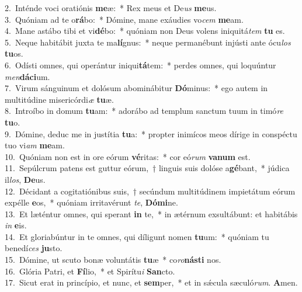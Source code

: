 {2.~}Inténde voci oratiónis \textbf{me}æ:~* Rex meus et De\textit{us} \textbf{me}us.\\
{3.~}Quóniam ad te o\textbf{rá}bo:~* Dómine, mane exáudies vo\textit{cem} \textbf{me}am.\\
{4.~}Mane astábo tibi et vi\textbf{dé}bo:~* quóniam non Deus volens iniquitá\textit{tem} \textbf{tu} es.\\
{5.~}Neque habitábit juxta te ma\textbf{lí}gnus:~* neque permanébunt injústi ante ócu\textit{los} \textbf{tu}os.\\
{6.~}Odísti omnes, qui operántur iniqui\textbf{tá}tem:~* perdes omnes, qui loquúntur \textit{men}\textbf{dá}\textbf{ci}um.\\
{7.~}Virum sánguinum et dolósum abominábitur \textbf{Dó}minus:~* ego autem in multitúdine misericórdi\textit{æ} \textbf{tu}æ.\\
{8.~}Introíbo in domum \textbf{tu}am:~* adorábo ad templum sanctum tuum in timó\textit{re} \textbf{tu}o.\\
{9.~}Dómine, deduc me in justítia \textbf{tu}a:~* propter inimícos meos dírige in conspéctu tuo vi\textit{am} \textbf{me}am.\\
{10.~}Quóniam non est in ore eórum \textbf{vé}ritas:~* cor eó\textit{rum} \textbf{va}\textbf{num} est.\\
{11.~}Sepúlcrum patens est guttur eórum,~† linguis suis dolóse a\textbf{gé}bant,~* júdica il\textit{los}, \textbf{De}us.\\
{12.~}Décidant a cogitatiónibus suis,~† secúndum multitúdinem impietátum eórum expélle \textbf{e}os,~* quóniam irritavérunt \textit{te}, \textbf{Dó}\textbf{mi}ne.\\
{13.~}Et læténtur omnes, qui sperant \textbf{in} te,~* in ætérnum exsultábunt: et habitábis \textit{in} \textbf{e}is.\\
{14.~}Et gloriabúntur in te omnes, qui díligunt nomen \textbf{tu}um:~* quóniam tu benedí\textit{ces} \textbf{ju}sto.\\
{15.~}Dómine, ut scuto bonæ voluntátis \textbf{tu}æ~* co\textit{ro}\textbf{ná}\textbf{sti} nos.\\
{16.~}Glória Patri, et \textbf{Fí}lio,~* et Spirítu\textit{i} \textbf{San}cto.\\
{17.~}Sicut erat in princípio, et nunc, et \textbf{sem}per,~* et in sǽcula sæculó\textit{rum}. \textbf{A}men.\\

